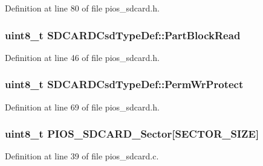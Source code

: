 \-Definition at line 80 of file pios\-\_\-sdcard.\-h.

\hypertarget{group___p_i_o_s___s_d_c_a_r_d_gab165bf6b064166e0bf54f2a6c7d85a9a}{
\subsubsection[{\-Part\-Block\-Read}]{\setlength{\rightskip}{0pt plus 5cm}uint8\-\_\-t {\bf \-S\-D\-C\-A\-R\-D\-Csd\-Type\-Def\-::\-Part\-Block\-Read}}}\label{group___p_i_o_s___s_d_c_a_r_d_gab165bf6b064166e0bf54f2a6c7d85a9a}


\-Definition at line 46 of file pios\-\_\-sdcard.\-h.

\hypertarget{group___p_i_o_s___s_d_c_a_r_d_ga191082389493442ce0b103f97282b952}{
\subsubsection[{\-Perm\-Wr\-Protect}]{\setlength{\rightskip}{0pt plus 5cm}uint8\-\_\-t {\bf \-S\-D\-C\-A\-R\-D\-Csd\-Type\-Def\-::\-Perm\-Wr\-Protect}}}\label{group___p_i_o_s___s_d_c_a_r_d_ga191082389493442ce0b103f97282b952}


\-Definition at line 69 of file pios\-\_\-sdcard.\-h.

\hypertarget{group___p_i_o_s___s_d_c_a_r_d_ga51dd7d1ab7b2ae3878345834e20546a6}{
\subsubsection[{\-P\-I\-O\-S\-\_\-\-S\-D\-C\-A\-R\-D\-\_\-\-Sector}]{\setlength{\rightskip}{0pt plus 5cm}uint8\-\_\-t {\bf \-P\-I\-O\-S\-\_\-\-S\-D\-C\-A\-R\-D\-\_\-\-Sector}\mbox{[}\-S\-E\-C\-T\-O\-R\-\_\-\-S\-I\-Z\-E\mbox{]}}}\label{group___p_i_o_s___s_d_c_a_r_d_ga51dd7d1ab7b2ae3878345834e20546a6}


\-Definition at line 39 of file pios\-\_\-sdcard.\-c.

